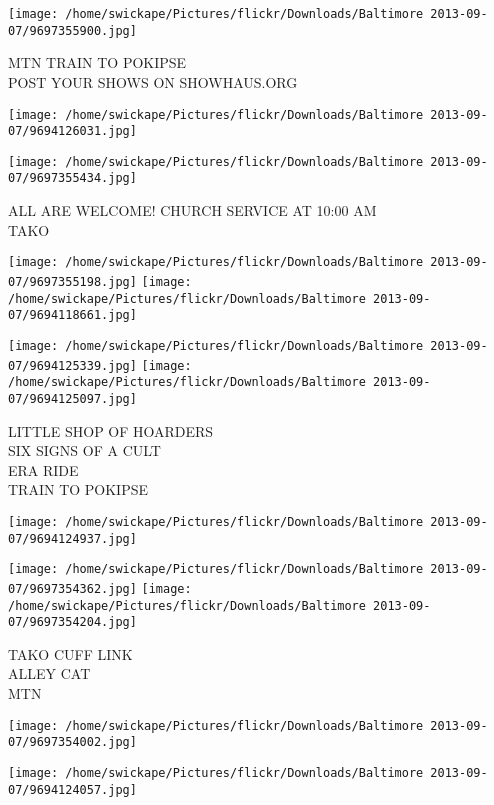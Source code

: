 \documentclass[10pt,letterpaper]{article}
\begin{document}
\vspace{0.25in}
\texttt{[image: /home/swickape/Pictures/flickr/Downloads/Baltimore 2013-09-07/9697355900.jpg]}

MTN TRAIN TO POKIPSE\\
POST YOUR SHOWS ON SHOWHAUS.ORG
\pagebreak

\texttt{[image: /home/swickape/Pictures/flickr/Downloads/Baltimore 2013-09-07/9694126031.jpg]}

\vspace{0.25in}
\texttt{[image: /home/swickape/Pictures/flickr/Downloads/Baltimore 2013-09-07/9697355434.jpg]}

ALL ARE WELCOME! CHURCH SERVICE AT 10:00 AM\\
TAKO
\pagebreak

\texttt{[image: /home/swickape/Pictures/flickr/Downloads/Baltimore 2013-09-07/9697355198.jpg]}
\texttt{[image: /home/swickape/Pictures/flickr/Downloads/Baltimore 2013-09-07/9694118661.jpg]}

\texttt{[image: /home/swickape/Pictures/flickr/Downloads/Baltimore 2013-09-07/9694125339.jpg]}
\texttt{[image: /home/swickape/Pictures/flickr/Downloads/Baltimore 2013-09-07/9694125097.jpg]}

LITTLE SHOP OF HOARDERS\\
SIX SIGNS OF A CULT\\
ERA RIDE\\
TRAIN TO POKIPSE
\pagebreak

\texttt{[image: /home/swickape/Pictures/flickr/Downloads/Baltimore 2013-09-07/9694124937.jpg]}

\vspace{0.25in}
\texttt{[image: /home/swickape/Pictures/flickr/Downloads/Baltimore 2013-09-07/9697354362.jpg]}
\texttt{[image: /home/swickape/Pictures/flickr/Downloads/Baltimore 2013-09-07/9697354204.jpg]}

TAKO CUFF LINK\\
ALLEY CAT\\
MTN
\pagebreak

\texttt{[image: /home/swickape/Pictures/flickr/Downloads/Baltimore 2013-09-07/9697354002.jpg]}

\vspace{0.25in}
\texttt{[image: /home/swickape/Pictures/flickr/Downloads/Baltimore 2013-09-07/9694124057.jpg]}
\end{document}
